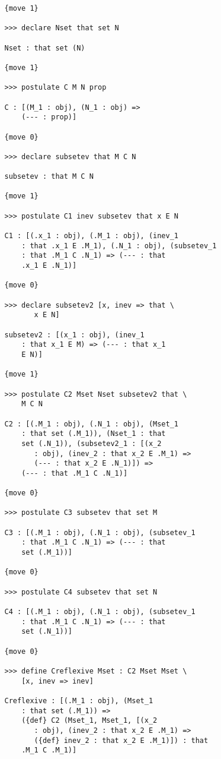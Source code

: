 \documentclass[12pt]{article}
\begin{document}
\begin{enumerate}
\begin{verbatim}
   {move 1}

   >>> declare Nset that set N

   Nset : that set (N)

   {move 1}

   >>> postulate C M N prop

   C : [(M_1 : obj), (N_1 : obj) => 
       (--- : prop)]

   {move 0}

   >>> declare subsetev that M C N

   subsetev : that M C N

   {move 1}

   >>> postulate C1 inev subsetev that x E N

   C1 : [(.x_1 : obj), (.M_1 : obj), (inev_1 
       : that .x_1 E .M_1), (.N_1 : obj), (subsetev_1 
       : that .M_1 C .N_1) => (--- : that 
       .x_1 E .N_1)]

   {move 0}

   >>> declare subsetev2 [x, inev => that \
          x E N]

   subsetev2 : [(x_1 : obj), (inev_1 
       : that x_1 E M) => (--- : that x_1 
       E N)]

   {move 1}

   >>> postulate C2 Mset Nset subsetev2 that \
       M C N

   C2 : [(.M_1 : obj), (.N_1 : obj), (Mset_1 
       : that set (.M_1)), (Nset_1 : that 
       set (.N_1)), (subsetev2_1 : [(x_2 
          : obj), (inev_2 : that x_2 E .M_1) => 
          (--- : that x_2 E .N_1)]) => 
       (--- : that .M_1 C .N_1)]

   {move 0}

   >>> postulate C3 subsetev that set M

   C3 : [(.M_1 : obj), (.N_1 : obj), (subsetev_1 
       : that .M_1 C .N_1) => (--- : that 
       set (.M_1))]

   {move 0}

   >>> postulate C4 subsetev that set N

   C4 : [(.M_1 : obj), (.N_1 : obj), (subsetev_1 
       : that .M_1 C .N_1) => (--- : that 
       set (.N_1))]

   {move 0}

   >>> define Creflexive Mset : C2 Mset Mset \
       [x, inev => inev]

   Creflexive : [(.M_1 : obj), (Mset_1 
       : that set (.M_1)) => 
       ({def} C2 (Mset_1, Mset_1, [(x_2 
          : obj), (inev_2 : that x_2 E .M_1) => 
          ({def} inev_2 : that x_2 E .M_1)]) : that 
       .M_1 C .M_1)]


\end{verbatim}
\end{enumerate}
\end{document}
